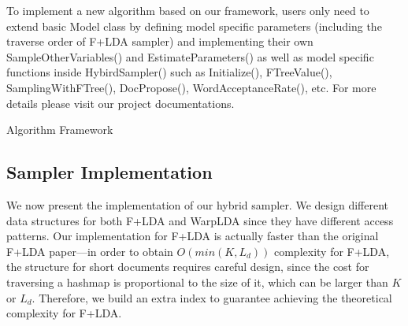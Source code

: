 \documentclass[10pt,journal,cspaper,compsoc]{IEEEtran}
\begin{document}
    To implement a new algorithm based on our framework, users only need
    to extend basic Model class by defining model specific parameters (including the traverse order of F+LDA sampler) and implementing their own SampleOtherVariables() and EstimateParameters() as well as model specific functions inside HybirdSampler() such as Initialize(), 
    FTreeValue(), SamplingWithFTree(), DocPropose(),  WordAcceptanceRate(), etc.
    For more details please visit our project documentations.
    
	\begin{algorithm}[t]
		\DontPrintSemicolon
		\caption{Algorithm Framework}
		\label{alg:framework}
	\end{algorithm}
    
	\subsection{Sampler Implementation}
	
	We now present the implementation of our hybrid sampler.
	We design different data structures for both F+LDA and WarpLDA
	since they have different access patterns. Our
	implementation for F+LDA is actually faster than
	the original F+LDA paper---in order
	to obtain $O(min(K, L_d))$ complexity for F+LDA, the structure
	for short documents requires careful design, since
	the cost for traversing a hashmap is proportional to the size
	of it, which can be larger than $K$ or $L_d$.
	Therefore, we build an extra index to guarantee achieving the
	theoretical complexity for F+LDA.
	\\
\end{document}
